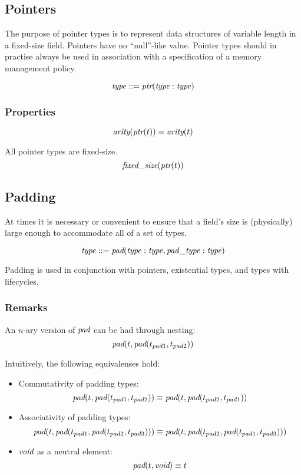 \documentclass[a4paper]{report}
\newcommand\arity{{\ensuremath\textit{arity}}}
\newcommand\fixedsize{{\ensuremath\textit{fixed\_size}}}
\newcommand\tyPtr{{\ensuremath\textit{ptr}}}
\newcommand\tyPad{{\ensuremath\textit{pad}}}
\newcommand\tyVoid{{\ensuremath\textit{void}}}
\begin{document}
\subsection{Pointers}
The purpose of pointer types is to represent data structures of variable length
in a fixed-size field.
Pointers have no ``null''-like value. Pointer types should in practise
always be used in association with a specification of a memory management
policy.

$$\it type ::= \tyPtr(type : type)$$

\subsubsection*{Properties}
$$ \arity(\tyPtr(t)) = \arity(t)$$

All pointer types are fixed-size.
$$\fixedsize(\tyPtr(t))$$

\subsection{Padding}
At times it is necessary or convenient to ensure that a field's size is
(physically) large enough to accommodate all of a set of types.

$$\it type ::= \tyPad(type : type, pad\_type : type)$$

Padding is used in conjunction with pointers, existential types,
and types with lifecycles.

\subsubsection*{Remarks}
An $n$-ary version of $\tyPad$ can be had through nesting:
$$\tyPad(t, \tyPad(t_{pad1}, t_{pad2}))$$

\noindent
Intuitively, the following equivalenses hold:

\begin{itemize}
\item Commutativity of padding types:
$$\tyPad(t, \tyPad(t_{pad1}, t_{pad2})) \equiv
  \tyPad(t, \tyPad(t_{pad2}, t_{pad1}))$$

\item Associativity of padding types:
$$\tyPad(t, \tyPad(t_{pad1}, \tyPad(t_{pad2}, t_{pad3}))) \equiv
\tyPad(t, \tyPad(t_{pad2}, \tyPad(t_{pad1}, t_{pad3})))$$

\item $\tyVoid$ as a neutral element:
$$\tyPad(t, \tyVoid) \equiv t$$

\end{itemize}
\end{document}

